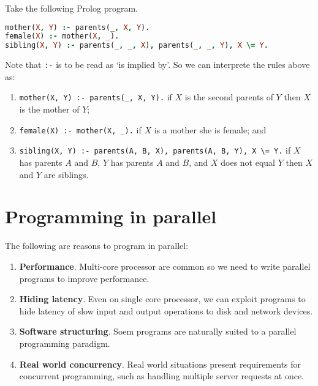 \begin{example}
    Take the following Prolog program.
    \begin{lstlisting}[language = Prolog]
mother(X, Y) :- parents(_, X, Y).
female(X) :- mother(X, _).
sibling(X, Y) :- parents(_, _, X), parents(_, _, Y), X \= Y.
    \end{lstlisting}
    Note that \texttt{:-} is to be read as `is implied by'. So we can interprete the rules above as:
    \begin{enumerate}
        \item \texttt{mother(X, Y) :- parents(\_, X, Y).} if $X$ is the second parents of $Y$ then $X$ is the mother of $Y$;
        \item \texttt{female(X) :- mother(X, \_).} if $X$ is a mother she is female; and
        \item \texttt{sibling(X, Y) :- parents(A, B, X), parents(A, B, Y), X \textbackslash = Y.} if $X$ has parents $A$ and $B$, $Y$ has parents $A$ and $B$, and $X$ does not equal $Y$ then $X$ and $Y$ are siblings.
    \end{enumerate}
\end{example}

\section{Programming in parallel}

The following are reasons to program in parallel:

\begin{enumerate}
    \item \textbf{Performance}. Multi-core processor are common so we need to write parallel programs to improve performance.
    
    \item \textbf{Hiding latency}. Even on single core processor, we can exploit programs to hide latency of slow input and output operations to disk and network devices.
    
    \item \textbf{Software structuring}. Soem programs are naturally suited to a parallel programming paradigm. %
    
    \item \textbf{Real world concurrency}. Real world situations present requirements for concurrent programming, such as handling multiple server requests at once.
\end{enumerate}

